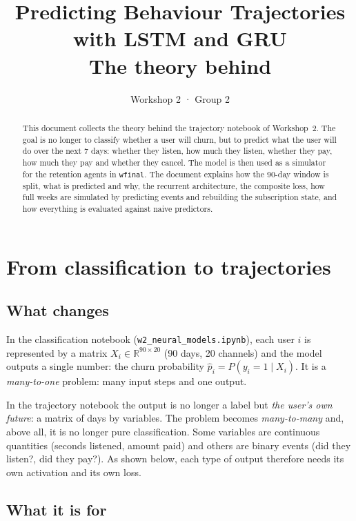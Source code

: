 \documentclass[11pt]{article}
\title{Predicting Behaviour Trajectories with LSTM and GRU\\[0.3em]
\large The theory behind \code{w2\_trajectory\_models.ipynb}}
\author{Workshop 2 · Group 2}
\date{}
\newcommand{\R}{\mathbb{R}}
\newcommand{\code}[1]{\texttt{#1}}
\begin{document}
\sloppy
\maketitle

\begin{abstract}
This document collects the theory behind the trajectory notebook of Workshop~2. The goal is no longer to classify whether a user will churn, but to predict what the user will do over the next 7 days: whether they listen, how much they listen, whether they pay, how much they pay and whether they cancel. The model is then used as a simulator for the retention agents in \code{wfinal}. The document explains how the 90-day window is split, what is predicted and why, the recurrent architecture, the composite loss, how full weeks are simulated by predicting events and rebuilding the subscription state, and how everything is evaluated against naive predictors.
\end{abstract}

\tableofcontents
\newpage

\section{From classification to trajectories}

\subsection{What changes}

In the classification notebook (\code{w2\_neural\_models.ipynb}), each user $i$ is represented by a matrix $X_i \in \R^{90 \times 20}$ (90 days, 20 channels) and the model outputs a single number: the churn probability $\hat p_i = P(y_i = 1 \mid X_i)$. It is a \emph{many-to-one} problem: many input steps and one output.

In the trajectory notebook the output is no longer a label but \emph{the user's own future}: a matrix of days by variables. The problem becomes \emph{many-to-many} and, above all, it is no longer pure classification. Some variables are continuous quantities (seconds listened, amount paid) and others are binary events (did they listen?, did they pay?). As shown below, each type of output therefore needs its own activation and its own loss.

\subsection{What it is for}
\end{document}
